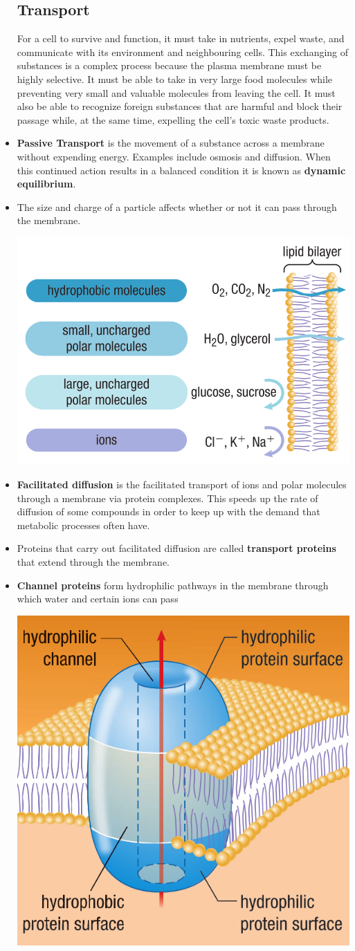 \documentclass[letterpaper]{article}
\numberwithin{equation}{section}
\theoremstyle{classic}
\begin{document}
\begin{itemize}
\subsection{Transport}
\begin{idea}
    For a cell to survive and function, it must take in nutrients, expel waste, and communicate with its environment and neighbouring cells. This exchanging of substances is a complex process because the plasma membrane must be highly selective. It must be able to take in very large food molecules while preventing very small and valuable molecules from leaving the cell. It must also be able to recognize foreign substances that are harmful and block their passage while, at the same time, expelling the cell’s toxic waste products. 
\end{idea}
\item \textbf{Passive Transport} is the movement of a substance across a membrane without expending energy. Examples include osmosis and diffusion. When this continued action results in a balanced condition it is known as \textbf{dynamic equilibrium}.
\item The size and charge of a particle affects whether or not it can pass through the membrane.
\begin{center}\includegraphics[width=0.4\linewidth]{A16.PNG}\end{center}
\item \textbf{Facilitated diffusion} is the facilitated transport of ions and polar molecules through a membrane via protein complexes. This speeds up the rate of diffusion of some compounds in order to keep up with the demand that metabolic processes often have.
\item Proteins that carry out facilitated diffusion are called \textbf{transport proteins} that extend through the membrane.
\item \textbf{Channel proteins} form hydrophilic pathways in the membrane through which water and certain ions can pass
\begin{center}\includegraphics[width=0.4\linewidth]{A17.PNG}\end{center}

\end{itemize}
\end{document}
